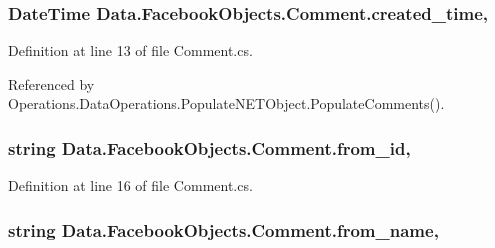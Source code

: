 \subsubsection[{\texorpdfstring{created\+\_\+time}{created_time}}]{\setlength{\rightskip}{0pt plus 5cm}Date\+Time Data.\+Facebook\+Objects.\+Comment.\+created\+\_\+time\hspace{0.3cm}{\ttfamily [get]}, {\ttfamily [set]}}\hypertarget{class_data_1_1_facebook_objects_1_1_comment_a3b7f2552fabc98705101aaae56beddd6}{}\label{class_data_1_1_facebook_objects_1_1_comment_a3b7f2552fabc98705101aaae56beddd6}


Definition at line 13 of file Comment.\+cs.



Referenced by Operations.\+Data\+Operations.\+Populate\+N\+E\+T\+Object.\+Populate\+Comments().

\subsubsection[{\texorpdfstring{from\+\_\+id}{from_id}}]{\setlength{\rightskip}{0pt plus 5cm}string Data.\+Facebook\+Objects.\+Comment.\+from\+\_\+id\hspace{0.3cm}{\ttfamily [get]}, {\ttfamily [set]}}\hypertarget{class_data_1_1_facebook_objects_1_1_comment_a05b0fbb7b709d35f6ba260b2df7c523c}{}\label{class_data_1_1_facebook_objects_1_1_comment_a05b0fbb7b709d35f6ba260b2df7c523c}


Definition at line 16 of file Comment.\+cs.

\subsubsection[{\texorpdfstring{from\+\_\+name}{from_name}}]{\setlength{\rightskip}{0pt plus 5cm}string Data.\+Facebook\+Objects.\+Comment.\+from\+\_\+name\hspace{0.3cm}{\ttfamily [get]}, {\ttfamily [set]}}\hypertarget{class_data_1_1_facebook_objects_1_1_comment_a07a44e439f904fc5e204c518328d3485}{}\label{class_data_1_1_facebook_objects_1_1_comment_a07a44e439f904fc5e204c518328d3485}


